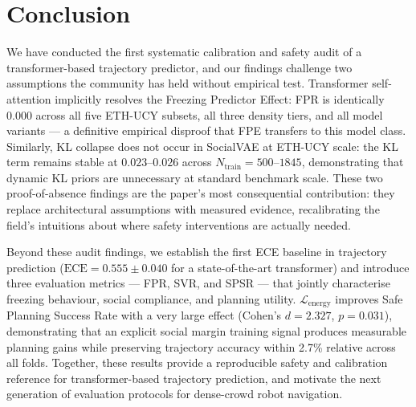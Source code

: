 \documentclass{article}
\begin{document}
 
\section{Conclusion}
\label{sec:conclusion}
 
We have conducted the first systematic calibration and safety audit of a
transformer-based trajectory predictor, and our findings challenge two
assumptions the community has held without empirical test. Transformer
self-attention implicitly resolves the Freezing Predictor Effect: FPR is
identically \(0.000\) across all five ETH-UCY subsets, all three density tiers,
and all model variants --- a definitive empirical disproof that FPE transfers
to this model class. Similarly, KL collapse does not occur in SocialVAE at
ETH-UCY scale: the KL term remains stable at \(0.023\)--\(0.026\) across
\(N_{\text{train}} = 500\)--\(1845\), demonstrating that dynamic KL priors
are unnecessary at standard benchmark scale. These two proof-of-absence
findings are the paper's most consequential contribution: they replace
architectural assumptions with measured evidence, recalibrating the field's
intuitions about where safety interventions are actually needed.
 
Beyond these audit findings, we establish the first ECE baseline in trajectory
prediction (\(\text{ECE} = 0.555 \pm 0.040\) for a state-of-the-art
transformer) and introduce three evaluation metrics --- FPR, SVR, and SPSR ---
that jointly characterise freezing behaviour, social compliance, and planning
utility. \(\mathcal{L}_{\text{energy}}\) improves Safe Planning Success Rate
with a very large effect (Cohen's \(d = 2.327\), \(p = 0.031\)), demonstrating
that an explicit social margin training signal produces measurable planning
gains while preserving trajectory accuracy within 2.7\% relative across all
folds. Together, these results provide a reproducible safety and calibration
reference for transformer-based trajectory prediction, and motivate the next
generation of evaluation protocols for dense-crowd robot navigation.




\end{document}
